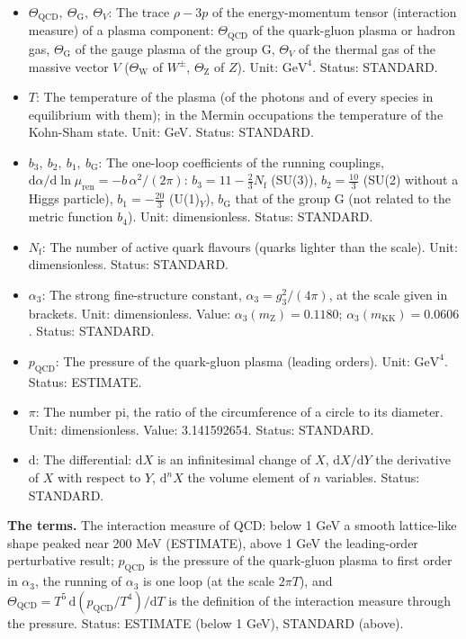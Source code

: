 \documentclass[
  10pt,
]{article}
\providecommand{\tightlist}{%
  \setlength{\itemsep}{0pt}\setlength{\parskip}{0pt}}
\begin{document}
\begin{itemize}
\tightlist
\item
  \(\Theta_{\mathrm{QCD}},\ \Theta_{\mathrm{G}},\ \Theta_V\): The trace
  \(\rho - 3p\) of the energy-momentum tensor (interaction measure) of a
  plasma component: \(\Theta_{\mathrm{QCD}}\) of the quark-gluon plasma
  or hadron gas, \(\Theta_{\mathrm{G}}\) of the gauge plasma of the
  group G, \(\Theta_V\) of the thermal gas of the massive vector \(V\)
  (\(\Theta_{\mathrm{W}}\) of \(W^\pm\), \(\Theta_{\mathrm{Z}}\) of
  \(Z\)). Unit: \(\mathrm{GeV}^{4}\). Status: STANDARD.
\item
  \(T\): The temperature of the plasma (of the photons and of every
  species in equilibrium with them); in the Mermin occupations the
  temperature of the Kohn-Sham state. Unit: GeV. Status: STANDARD.
\item
  \(b_3,\ b_2,\ b_1,\ b_{\mathrm{G}}\): The one-loop coefficients of the
  running couplings,
  \(\mathrm{d}\alpha/\mathrm{d}\ln\mu_{\mathrm{ren}} = -b\,\alpha^2/(2\pi)\):
  \(b_3 = 11 - \frac23N_{\mathrm{f}}\) (SU(3)), \(b_2 = \frac{10}{3}\)
  (SU(2) without a Higgs particle), \(b_1 = -\frac{20}{3}\)
  (U(1)\(_Y\)), \(b_{\mathrm{G}}\) that of the group G (not related to
  the metric function \(b_4\)). Unit: dimensionless. Status: STANDARD.
\item
  \(N_{\mathrm{f}}\): The number of active quark flavours (quarks
  lighter than the scale). Unit: dimensionless. Status: STANDARD.
\item
  \(\alpha_3\): The strong fine-structure constant,
  \(\alpha_3 = g_3^2/(4\pi)\), at the scale given in brackets. Unit:
  dimensionless. Value: \(\alpha_3(m_{\mathrm{Z}}) = 0.1180\);
  \(\alpha_3(m_{\mathrm{KK}}) = 0.0606\). Status: STANDARD.
\item
  \(p_{\mathrm{QCD}}\): The pressure of the quark-gluon plasma (leading
  orders). Unit: \(\mathrm{GeV}^{4}\). Status: ESTIMATE.
\item
  \(\pi\): The number pi, the ratio of the circumference of a circle to
  its diameter. Unit: dimensionless. Value: 3.141592654. Status:
  STANDARD.
\item
  \(\mathrm{d}\): The differential: \(\mathrm{d}X\) is an infinitesimal
  change of \(X\), \(\mathrm{d}X/\mathrm{d}Y\) the derivative of \(X\)
  with respect to \(Y\), \(\mathrm{d}^nX\) the volume element of \(n\)
  variables. Status: STANDARD.
\end{itemize}

\textbf{The terms.} The interaction measure of QCD: below 1 GeV a smooth
lattice-like shape peaked near 200 MeV (ESTIMATE), above 1 GeV the
leading-order perturbative result; \(p_{\mathrm{QCD}}\) is the pressure
of the quark-gluon plasma to first order in \(\alpha_3\), the running of
\(\alpha_3\) is one loop (at the scale \(2\pi T\)), and
\(\Theta_{\mathrm{QCD}} = T^5\,\mathrm{d}(p_{\mathrm{QCD}}/T^4)/\mathrm{d}T\)
is the definition of the interaction measure through the pressure.
Status: ESTIMATE (below 1 GeV), STANDARD (above).
\end{document}
